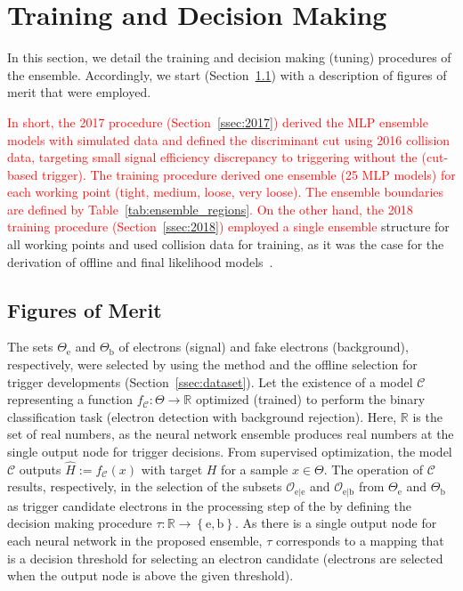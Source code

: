 \section{Training and Decision Making}%
\label{sec:tuning}

In this section, we detail the training and decision making (tuning) procedures
of the \rnn ensemble. Accordingly, we start (Section~\ref{ssec:fom}) with a
description of figures of merit that were employed.

\textcolor{red}{
In short, the 2017 procedure (Section~\ref{ssec:2017}) derived the MLP ensemble
models with simulated data and defined the discriminant cut using
2016 collision data, targeting small signal efficiency discrepancy to triggering 
without the \rnn{} (cut-based trigger). The training procedure derived one ensemble (25 MLP models) for each working
point (tight, medium, loose, very loose). The ensemble boundaries are defined by Table~\ref{tab:ensemble_regions}. On the other hand, the 2018 training procedure (Section~\ref{ssec:2018})
employed a single ensemble} structure for all working points and used
collision data for training, as it was the case for the derivation of offline
and final \hlt likelihood models~\cite{aaboud2019electron}.






\subsection{Figures of Merit}\label{ssec:fom}



The sets $\Theta_{\text{e}}$ and $\Theta_{\text{b}}$ of electrons (signal) and fake electrons (background), respectively, were selected by using the \tnp{} method and the offline selection for trigger developments (Section~\ref{ssec:dataset}). Let the existence of a model $\mathcal{C}$ representing a function $f_{\mathcal{C}} : \Theta \rightarrow \mathbb{R}$ optimized (trained) to perform the binary classification task (electron detection with background rejection). Here, $\mathbb{R}$ is the set of real numbers, as the neural network ensemble produces real numbers at the single output node for trigger decisions.  From supervised optimization, the model $\mathcal{C}$ outputs $\hat{H}:=f_{\mathcal{C}}(x)$ with target $H$ for a sample $x \in \Theta$. The operation of $\mathcal{C}$ results, respectively, in the selection of the subsets $\mathcal{O}_{\text{e}|\text{e}}$ and $\mathcal{O}_{\text{e}|\text{b}}$ from $\Theta_{\text{e}}$ and $\Theta_{\text{b}}$ as trigger candidate electrons in the \fastcalo{} processing step of the \hlt{} by defining the decision making procedure $\tau : \mathbb{R} \rightarrow \left\{\text{e},\text{b}\right\}$. As there is a single output node for each neural network in the proposed \rnn{} ensemble, $\tau$ corresponds to a mapping that is a decision threshold for selecting an electron candidate (electrons are selected when the output node is above the given threshold).  


